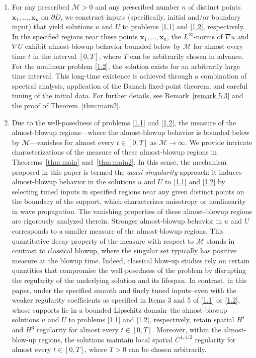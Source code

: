 \documentclass[11pt,reqno,oneside]{amsart}
\numberwithin{equation}{section}
\theoremstyle{definition}
\theoremstyle{remark}
\numberwithin{equation}{section}
\begin{document}
	\begin{enumerate}
		\renewcommand{\labelenumi}{(\roman{enumi})}
		\item %
		For any prescribed $\mathcal{M} > 0$ and any prescribed number $n$ of distinct points $\mathbf{x}_1, \dots, \mathbf{x}_n$ on $\partial D$, we construct inputs (specifically, initial and/or boundary input) that yield solutions $u$ and $U$ to problems \eqref{1.1} and \eqref{1.2}, respectively. In the specified regions near these points $\mathbf{x}_1, \dots, \mathbf{x}_n$, the $L^\infty$-norms of $\nabla u$ and $\nabla U$ exhibit almost-blowup behavior bounded below by $\mathcal{M}$ for almost every time $t$ in the interval $[0, T]$, where $T$ can be arbitrarily chosen in advance. For the nonlinear problem \eqref{1.2}, the solution exists for an arbitrarily large time interval. This long-time existence is achieved through a combination of spectral analysis, application of the Banach fixed-point theorem, and careful tuning of the initial data. For further details, see Remark~\ref{remark 5.3} and the proof of Theorem~\ref{thm:main2}.
		
		\item 
		
		Due to the well-posedness of problems \eqref{1.1} and \eqref{1.2}, the measure of the almost-blowup regions---where the almost-blowup behavior is bounded below by $\mathcal{M}$---vanishes for almost every $t \in [0,T]$ as $\mathcal{M} \to \infty$. We provide intricate characterizations of the measure of these almost-blowup regions in Theorems~\ref{thm:main} and~\ref{thm:main2}. In this sense, the mechanism proposed in this paper is termed the \emph{quasi-singularity} approach: it induces almost-blowup behavior in the solutions $u$ and $U$ to \eqref{1.1} and \eqref{1.2} by selecting tuned inputs in specified regions near any given distinct points on the boundary of the support, which characterizes anisotropy or nonlinearity in wave propagation. The vanishing properties of these almost-blowup regions are rigorously analyzed therein. Stronger almost-blowup behavior in $u$ and $U$ corresponds to a smaller measure of the almost-blowup regions. This quantitative decay property of the measure with respect to $\mathcal{M}$ stands in contrast to classical blowup, where the singular set typically has positive measure at the blowup time. Indeed, classical blow-up studies rely on certain quantities that compromise the well-posedness of the problem by disrupting the regularity of the underlying solution and its lifespan. In contrast, in this paper, under the specified smooth and finely tuned inputs--even with the weaker regularity coefficients as specified in Items 3 and 5 of \eqref{1.1} or \eqref{1.2}, whose supports lie in a bounded Lipschitz domain--the almost-blowup solutions $u$ and $U$ to problems \eqref{1.1} and \eqref{1.2}, respectively, retain spatial $H^1$ and $H^3$ regularity for almost every $t \in [0,T]$. Moreover, within the almost-blow-up regions, the solutions maintain local spatial $C^{1,1/2}$ regularity for almost every $t \in [0,T]$, where $T > 0$ can be chosen arbitrarily.
	\end{enumerate} 
	
\end{document}

